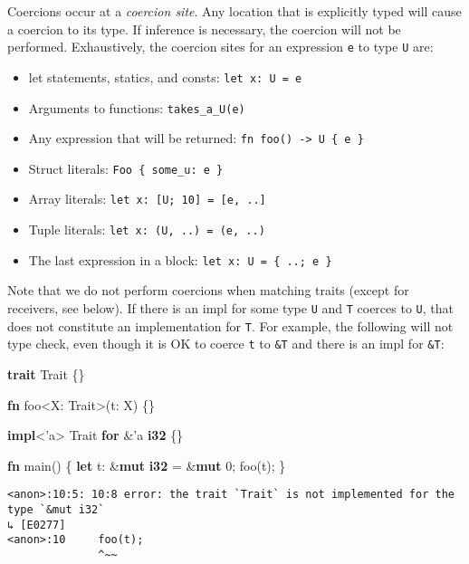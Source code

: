 \documentclass[a4paper,]{book}
\newenvironment{Shaded}{\begin{snugshade}}{\end{snugshade}}
\newcommand{\KeywordTok}[1]{\textcolor[rgb]{0.13,0.29,0.53}{\textbf{{#1}}}}
\newcommand{\DecValTok}[1]{\textcolor[rgb]{0.00,0.00,0.81}{{#1}}}
\newcommand{\OtherTok}[1]{\textcolor[rgb]{0.56,0.35,0.01}{{#1}}}
\newcommand{\NormalTok}[1]{{#1}}
\begin{document}
Coercions occur at a \emph{coercion site}. Any location that is
explicitly typed will cause a coercion to its type. If inference is
necessary, the coercion will not be performed. Exhaustively, the
coercion sites for an expression \texttt{e} to type \texttt{U} are:

\begin{itemize}
\itemsep1pt\parskip0pt
\item
  let statements, statics, and consts: \texttt{let\ x:\ U\ =\ e}
\item
  Arguments to functions: \texttt{takes\_a\_U(e)}
\item
  Any expression that will be returned:
  \texttt{fn\ foo()\ -\textgreater{}\ U\ \{\ e\ \}}
\item
  Struct literals: \texttt{Foo\ \{\ some\_u:\ e\ \}}
\item
  Array literals: \texttt{let\ x:\ {[}U;\ 10{]}\ =\ {[}e,\ ..{]}}
\item
  Tuple literals: \texttt{let\ x:\ (U,\ ..)\ =\ (e,\ ..)}
\item
  The last expression in a block: \texttt{let\ x:\ U\ =\ \{\ ..;\ e\ \}}
\end{itemize}

Note that we do not perform coercions when matching traits (except for
receivers, see below). If there is an impl for some type \texttt{U} and
\texttt{T} coerces to \texttt{U}, that does not constitute an
implementation for \texttt{T}. For example, the following will not type
check, even though it is OK to coerce \texttt{t} to \texttt{\&T} and
there is an impl for \texttt{\&T}:

\begin{Shaded}
\begin{Highlighting}[]
\KeywordTok{trait} \NormalTok{Trait \{\}}

\KeywordTok{fn} \NormalTok{foo<X: Trait>(t: X) \{\}}

\KeywordTok{impl}\NormalTok{<}\OtherTok{'a}\NormalTok{> Trait }\KeywordTok{for} \NormalTok{&}\OtherTok{'a} \KeywordTok{i32} \NormalTok{\{\}}


\KeywordTok{fn} \NormalTok{main() \{}
    \KeywordTok{let} \NormalTok{t: &}\KeywordTok{mut} \KeywordTok{i32} \NormalTok{= &}\KeywordTok{mut} \DecValTok{0}\NormalTok{;}
    \NormalTok{foo(t);}
\NormalTok{\}}
\end{Highlighting}
\end{Shaded}

\begin{verbatim}
<anon>:10:5: 10:8 error: the trait `Trait` is not implemented for the type `&mut i32` 
↳ [E0277]
<anon>:10     foo(t);
              ^~~
\end{verbatim}
\end{document}
